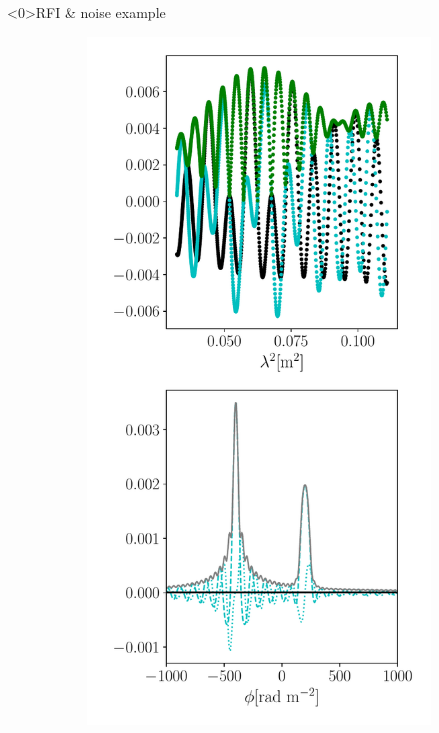 \documentclass[xetex,aspectratio=169]{beamer}
\begin{document}
\begin{frame}<0>{RFI \& noise example}

	\begin{figure}
		\centering

		\begin{subfigure}{0.2\textwidth}
			\includegraphics[width=\textwidth]{figures/dataset_features/data_normal.pdf}

\end{subfigure}
\end{figure}
\end{frame}
\end{document}
